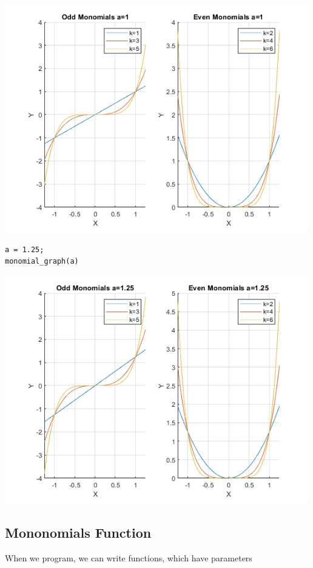 \documentclass[
]{book}
\begin{document}
\includegraphics[width=5.20833in,height=\textheight]{img/polynomial_images/figure_1.png}

\begin{verbatim}
a = 1.25;
monomial_graph(a)
\end{verbatim}

\includegraphics[width=5.20833in,height=\textheight]{img/polynomial_images/figure_2.png}

\hypertarget{mononomials-function}{%
\subsection{Mononomials Function}\label{mononomials-function}}

When we program, we can write functions, which have parameters
\end{document}
